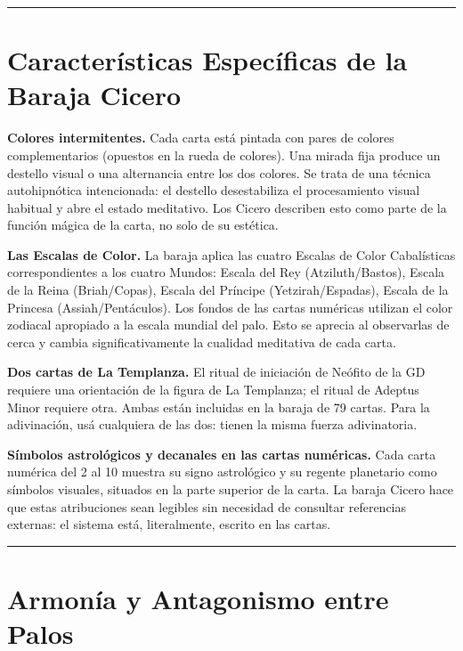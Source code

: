 \begin{center}\rule{0.5\linewidth}{0.5pt}\end{center}

\section{Características Específicas de la Baraja Cicero}\label{features-specific-to-the-cicero-deck}

\textbf{Colores intermitentes.} Cada carta está pintada con pares de colores complementarios (opuestos en la rueda de colores). Una mirada fija produce un destello visual o una alternancia entre los dos colores. Se trata de una técnica autohipnótica intencionada: el destello desestabiliza el procesamiento visual habitual y abre el estado meditativo. Los Cicero describen esto como parte de la función mágica de la carta, no solo de su estética.

\textbf{Las Escalas de Color.} La baraja aplica las cuatro Escalas de Color Cabalísticas correspondientes a los cuatro Mundos: Escala del Rey (Atziluth/Bastos), Escala de la Reina (Briah/Copas), Escala del Príncipe (Yetzirah/Espadas), Escala de la Princesa (Assiah/Pentáculos). Los fondos de las cartas numéricas utilizan el color zodiacal apropiado a la escala mundial del palo. Esto se aprecia al observarlas de cerca y cambia significativamente la cualidad meditativa de cada carta.

\textbf{Dos cartas de La Templanza.} El ritual de iniciación de Neófito de la GD requiere una orientación de la figura de La Templanza; el ritual de Adeptus Minor requiere otra. Ambas están incluidas en la baraja de 79 cartas. Para la adivinación, usá cualquiera de las dos: tienen la misma fuerza adivinatoria.

\textbf{Símbolos astrológicos y decanales en las cartas numéricas.} Cada carta numérica del 2 al 10 muestra su signo astrológico y su regente planetario como símbolos visuales, situados en la parte superior de la carta. La baraja Cicero hace que estas atribuciones sean legibles sin necesidad de consultar referencias externas: el sistema está, literalmente, escrito en las cartas.

\begin{center}\rule{0.5\linewidth}{0.5pt}\end{center}

\section{Armonía y Antagonismo entre Palos}\label{suit-harmony-and-antagonism}

